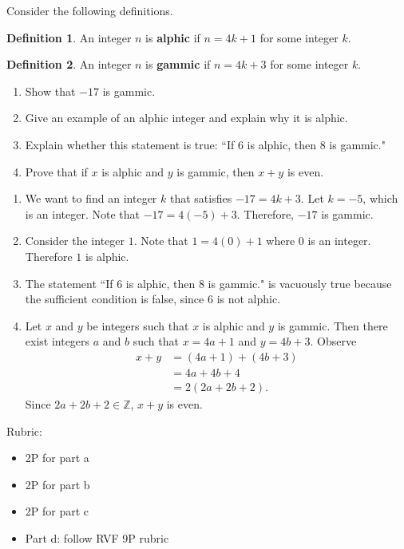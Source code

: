 \documentclass{article}
\theoremstyle{definition}
\newtheorem*{definition}{Definition}
\begin{document}
\begin{question}{15}
    Consider the following definitions.
	\begin{definition}
	 An integer $n$ is \textbf{alphic} if $n=4k+1$ for some integer $k$.
	\end{definition}
	\begin{definition}
	 An integer $n$ is \textbf{gammic} if $n=4k+3$ for some integer $k$.
	\end{definition}
        \begin{enumerate}
           \item Show that $-17$ is gammic.
           \item Give an example of an alphic integer and explain why it is alphic.
           \item Explain whether this statement is true: ``If $6$ is alphic, then $8$ is gammic."
           \item Prove that if $x$ is alphic and $y$ is gammic, then $x+y$ is even.
        \end{enumerate}
\end{question}
\begin{solution}
    \begin{enumerate}
      \item We want to find an integer $k$ that satisfies $-17=4k+3$. Let $k=-5$, which is an integer. Note that $-17 = 4(-5) + 3$. Therefore, $-17$ is gammic.
      \item Consider the integer $1$. Note that $1 = 4(0) +1$ where $0$ is an integer. Therefore $1$ is alphic.
      \item The statement ``If $6$ is alphic, then $8$ is gammic." is vacuously true because the sufficient condition is false, since $6$ is not alphic.
      \item Let $x$ and $y$ be integers such that $x$ is alphic and $y$ is gammic. Then there exist integers $a$ and $b$ such that $x=4a+1$ and $y=4b+3$. Observe
      \begin{align*}
      x + y & = (4a+1) + (4b+3)\\
      & = 4a + 4b + 4\\
      & = 2 ( 2a + 2b + 2).
      \end{align*}
      Since $2a + 2b + 2\in \mathbb{Z}$, $x + y$ is even.
    \end{enumerate}
    
{\color{red} Rubric:
\begin{itemize}
\item 2P for part a
\item 2P for part b
\item 2P for part c
\item Part d: follow RVF 9P rubric
\end{itemize}}
\end{solution}
\end{document}
